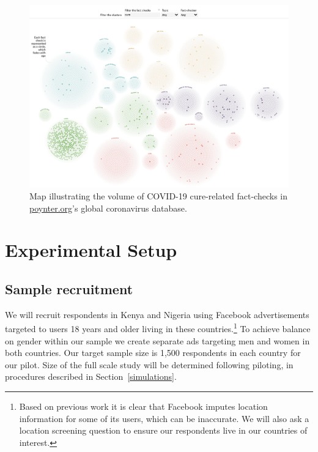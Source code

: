 \documentclass[letterpaper, 12pt, parskip=full,]{scrartcl}
\begin{document}
\begin{figure}[htb]
\centering
\caption{Map illustrating the volume of COVID-19 cure-related fact-checks in \url{poynter.org}'s global coronavirus database.}
\label{fig:poynter_cures}
\includegraphics[width=.95\textwidth]{poynter_cures.png} 
\end{figure}


\FloatBarrier
\section{Experimental Setup}



\subsection{Sample recruitment}
We will recruit respondents in Kenya and Nigeria using Facebook advertisements targeted to users 18 years and older living in these countries.\footnote{Based on previous work it is clear that Facebook imputes location information for some of its users, which can be inaccurate. We will also ask a location screening question to ensure our respondents live in our countries of interest.} To achieve balance on gender within our sample we create separate ads targeting men and women in both countries. Our target sample size is 1,500 respondents in each country for our pilot. Size of the full scale study will be determined following piloting, in procedures described in Section~\ref{simulations}.
\end{document}
